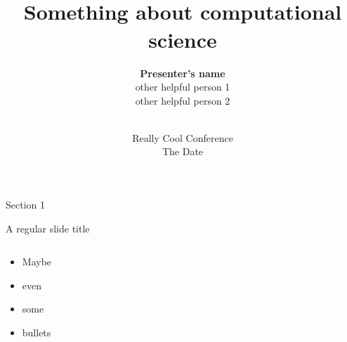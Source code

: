 \documentclass[11pt]{beamer}
\begin{document}
\title{\vspace{2ex}\\
       Something about computational science\\
       \vspace{2ex}
   } 
\author{\textbf{Presenter's name}\\
        other helpful person 1\\
        other helpful person 2}
\date{
    \vspace{2ex}\\
    \centering
    Really Cool Conference\\ 
    The Date
    \\
}



\begin{frame}
  \titlepage
\end{frame}

\begin{section}{Section 1}

    \begin{frame}{A regular slide title}

        \begin{columns}
            \hspace{.1cm}
            \begin{column}{.5\textwidth}
                \begin{itemize}
                    \item<1-> Maybe
                        \vspace{.25cm}
                    \item<2-> even
                        \vspace{.25cm}
                    \item<3-> some
                        \vspace{.25cm}
                    \item<4-> bullets
                \end{itemize}
            \end{column}
            \begin{column}{.45\textwidth}
            \end{column}
        \end{columns}
    \end{frame}
\end{section}
\end{document}
